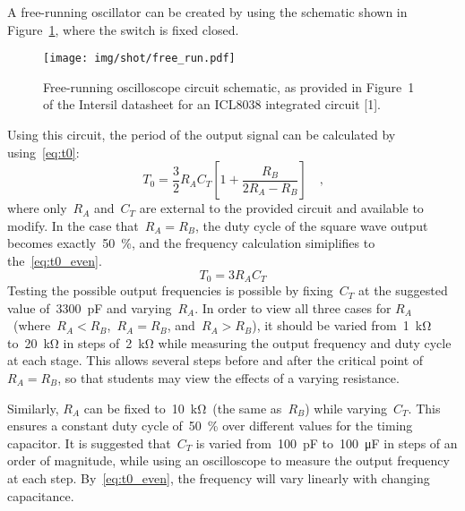 A free-running oscillator can be created by using the schematic shown in
Figure~\ref{fig:free_run}, where the switch is fixed closed.
%
\begin{figure}[H]
	\centering
	\texttt{[image: img/shot/free\_run.pdf]}
	\parbox{.6\textwidth}{
	\caption{Free-running oscilloscope circuit schematic, as provided in Figure~1 of the
	Intersil datasheet for an ICL8038 integrated circuit [1].}
	\label{fig:free_run}}
\end{figure}
%
Using this circuit, the period of the output signal can be calculated by using~\eqref{eq:t0}:
%
\begin{equation}
	T_0 = \frac{3}{2} R_A C_T \left[ 1 + \frac{R_B}{2R_A - R_B} \right] \quad \text{,}
	\label{eq:t0}
\end{equation}
%
where only~$R_A$ and~$C_T$ are external to the provided circuit and available
to modify.  In the case that~$R_A = R_B$, the duty cycle of the square wave
output becomes exactly~\SI{50}{\percent}, and the frequency calculation
simiplifies to the~\eqref{eq:t0_even}.
%
\begin{equation}
	T_0 = 3 R_A C_T
	\label{eq:t0_even}
\end{equation}
%
Testing the possible output frequencies is possible by fixing~$C_T$ at the
suggested value of~\SI{3300}{\pico\farad} and varying~$R_A$.  In order to view
all three cases for $R_A$~(where~$R_A < R_B$,~$R_A = R_B$, and~$R_A > R_B$), it
should be varied from~\SI{1}{\kilo\ohm} to~\SI{20}{\kilo\ohm} in steps
of~\SI{2}{\kilo\ohm} while measuring the output frequency and duty cycle at
each stage.  This allows several steps before and after the critical point
of~$R_A = R_B$, so that students may view the effects of a varying resistance.

Similarly, $R_A$ can be fixed to~\SI{10}{\kilo\ohm}~(the same as~$R_B$) while
varying~$C_T$.  This ensures a constant duty cycle of~\SI{50}{\percent} over
different values for the timing capacitor.  It is suggested that~$C_T$ is
varied from~\SI{100}{\pico\farad} to~\SI{100}{\micro\farad} in steps of an
order of magnitude, while using an oscilloscope to measure the output frequency
at each step.  By~\eqref{eq:t0_even}, the frequency will vary linearly with
changing capacitance.


